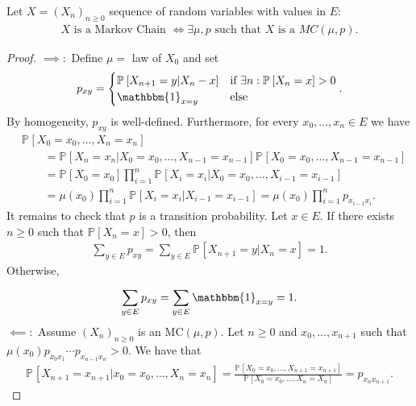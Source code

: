 \begin{prop}
	Let $X=(X_n)_{n \geq 0}$ sequence of random variables with values in $E$:
	\begin{align}
	X\textrm{ is a Markov Chain }\iff \exists \mu, p\textrm{ such that }X\textrm{ is a }MC(\mu, p)
	.\end{align}
	
\end{prop}
\begin{proof}
	$\implies:$ Define $\mu =$ law of $X_0$ and set 
	\begin{align}
		p_{xy} = 
	\begin{cases}
		\mathbb{P}_{} \left[ X_{n+1}=y | X_n -x \right] & \textrm{if } \exists n: \mathbb{P}_{} \left[ X_n = x \right] >0 \\
		\mathbbm{1}_{x=y} & \textrm{else}
	\end{cases}.
	\end{align}
	By homogeneity, $p_{xy}$ is well-defined. Furthermore, for every $x_0,\ldots,x_n \in E$ we have
\begin{align}
& \mathbb{P}_{} \left[ X_0=x_0, \ldots ,X_n=x_n \right] \\ 
	& \qquad = \mathbb{P}_{} \left[ X_n = x_n | X_0=x_0 , \ldots , X_{n-1}=x_{n-1} \right] \mathbb{P}_{} \left[ X_0=x_0 , \ldots , X_{n-1}=x_{n-1} \right] \\
	& \qquad = \mathbb{P}_{} \left[ X_0 = x_0 \right] \prod_{i=1}^{n} \mathbb{P}_{} \left[ X_i = x_i | X_0=x_0, \ldots , X_{i-1}=x_{i-1} \right] \\
	& \qquad = \mu(x_0) \prod_{i=1}^n \mathbb{P}_{} \left[ X_i = x_i | X_{i-1} = x_{i-1}  \right] = \mu(x_0) \prod_{i=1}^n p_{x_{i-1}x_{i}} 
.\end{align}
It remains to check that $p$ is a transition probability. Let $x \in E$. If there exists $n\geq 0$ such that $\mathbb{P}_{} \left[ X_n=x \right] >0$, then 
\begin{align}
	\sum_{y \in E}^{} p_{xy} = \sum_{y \in E}^{} \mathbb{P}_{} \left[ X_{n+1}=y | X_n =x \right] =1.
\end{align}
Otherwise,
\begin{align}
	\sum_{y \in E}^{} p_{xy} = \sum_{y \in E}^{} \mathbbm{1}_{x=y} =1
.\end{align}
$\impliedby:$ Assume  $(X_n)_{n\geq 0}$ is an MC$(\mu ,p)$. Let $n\geq 0$ and $x_0,\ldots,x_{n+1}$ such that $\mu (x_0) p_{x_0 x_1}\cdots p_{x_{n-1}x_n}>0$. We have that
\begin{align}
	\mathbb{P}_{} \left[ X_{n+1} = x_{n+1} | x_0 = x_0, \ldots, X_n = x_n \right] = \frac{\mathbb{P}_{} \left[ X_0 = x_0, \ldots, X_{n+1}= x_{n+1} \right] }{\mathbb{P}_{} \left[ X_0=x_0, \ldots, X_n = X_n \right] } = p_{x_nx_{n+1}}.

\end{align}
\end{proof}
